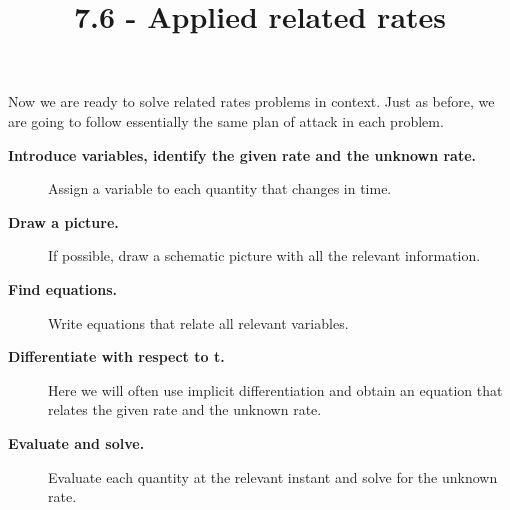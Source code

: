\documentclass{ximera}
\title{7.6 - Applied related rates}
\begin{document}
	\begin{abstract}
	\end{abstract}
	\maketitle
	
	Now we are ready to solve related rates problems in context. Just as
	before, we are going to follow essentially the same plan of attack in
	each problem.
	
	
	\begin{description}
		\item[\textbf{Introduce variables, identify the given rate and the unknown rate.}] Assign a variable to each quantity that changes in time.
		\item[\textbf{Draw a picture.}] If possible, draw a schematic picture with all the relevant information. 
		\item[\textbf{Find equations.}] Write equations that relate all
		relevant variables.
		\item[\textbf{Differentiate with respect to t.}] Here we will often use
		implicit differentiation and obtain an equation that relates the given rate and the unknown rate. 
		\item[\textbf{Evaluate and solve.}] Evaluate
		each quantity at the relevant instant and solve for the unknown rate.
		
	\end{description}
	
	
	
	
\end{document}
